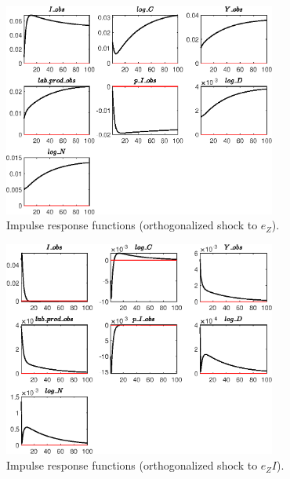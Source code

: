  
\begin{figure}[H]
\centering 
\includegraphics[width=0.80\textwidth]{BRS_est_shopping/graphs/BRS_est_shopping_IRF_e_Z}
\caption{Impulse response functions (orthogonalized shock to ${e_Z}$).}
\label{Fig:IRF:e_Z}
\end{figure}
 
\begin{figure}[H]
\centering 
\includegraphics[width=0.80\textwidth]{BRS_est_shopping/graphs/BRS_est_shopping_IRF_e_ZI}
\caption{Impulse response functions (orthogonalized shock to ${e_ZI}$).}
\label{Fig:IRF:e_ZI}
\end{figure}
 
